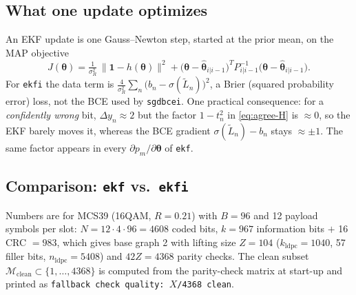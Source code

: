 \documentclass{article}
\newcommand{\state}{\boldsymbol{\theta}}
\begin{document}
\subsection{What one update optimizes}

An EKF update is one Gauss--Newton step, started at the prior mean, on the MAP objective
\begin{equation}
J(\state) = \tfrac{1}{\sigma_R^2}\,\big\|\mathbf{1}-h(\state)\big\|^2
          + \big(\state-\hat{\state}_{i|i-1}\big)^T P_{i|i-1}^{-1}\big(\state-\hat{\state}_{i|i-1}\big).
\end{equation}
For \texttt{ekfi} the data term is
$\tfrac{4}{\sigma_R^2}\sum_n \big(b_n-\sigma(\widetilde{L}_n)\big)^2$, a Brier (squared
probability error) loss, not the BCE used by \texttt{sgdbcei}. One practical consequence: for a
\emph{confidently wrong} bit, $\Delta y_n\approx 2$ but the factor $1-t_n^2$ in
\eqref{eq:agree-H} is $\approx 0$, so the EKF barely moves it, whereas the BCE gradient
$\sigma(\widetilde{L}_n)-b_n$ stays $\approx\pm1$. The same factor appears in every
$\partial p_m/\partial\state$ of \texttt{ekf}.

\subsection{Comparison: \texttt{ekf} vs.\ \texttt{ekfi}}

Numbers are for MCS39 (16QAM, $R=0.21$) with $B=96$ and 12 payload symbols per slot:
$N=12\cdot4\cdot96=4608$ coded bits, $k=967$ information bits $+$ 16 CRC $=983$, which gives
base graph 2 with lifting size $Z=104$ ($k_{\text{ldpc}}=1040$, 57 filler bits,
$n_{\text{ldpc}}=5408$) and $42Z=4368$ parity checks. The clean subset
$\mathcal{M}_{\text{clean}}\subset\{1,\dots,4368\}$ is computed from the parity-check matrix at
start-up and printed as \texttt{fallback check quality: $X$/4368 clean}.
\end{document}
